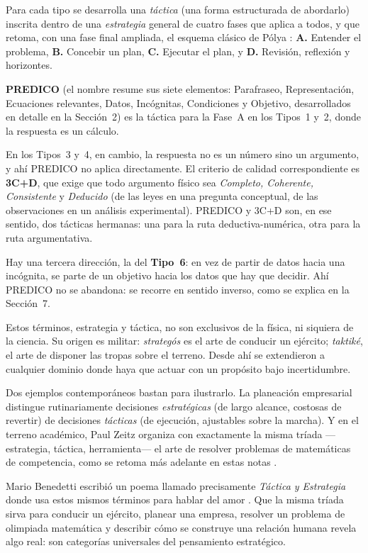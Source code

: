 \documentclass[11pt]{book}
\begin{document}
\medskip
Para cada tipo se desarrolla una {\it táctica} (una forma estructurada de abordarlo) inscrita dentro de una {\it estrategia} general de cuatro fases que aplica a todos, y que retoma, con una fase final ampliada, el esquema clásico de Pólya \cite{Polya1945}: {\bf A.} Entender el problema, {\bf B.} Concebir un plan, {\bf C.} Ejecutar el plan, y {\bf D.} Revisión, reflexión y horizontes.

\medskip
{\bf PREDICO} (el nombre resume sus siete elementos: Parafraseo, Representación, Ecuaciones relevantes, Datos, Incógnitas, Condiciones y Objetivo, desarrollados en detalle en la Sección~2) es la táctica para la Fase~A en los Tipos~1 y~2, donde la respuesta es un cálculo.

\medskip
En los Tipos~3 y~4, en cambio, la respuesta no es un número sino un argumento, y ahí PREDICO no aplica directamente. El criterio de calidad correspondiente es {\bf 3C+D}, que exige que todo argumento físico sea {\it Completo, Coherente, Consistente} y {\it Deducido} (de las leyes en una pregunta conceptual, de las observaciones en un análisis experimental). PREDICO y 3C+D son, en ese sentido, dos tácticas hermanas: una para la ruta deductiva-numérica, otra para la ruta argumentativa.

\medskip
Hay una tercera dirección, la del {\bf Tipo~6}: en vez de partir de datos hacia una incógnita, se parte de un objetivo hacia los datos que hay que decidir. Ahí PREDICO no se abandona: se recorre en sentido inverso, como se explica en la Sección~7.

\medskip
Estos términos, estrategia y táctica, no son exclusivos de la física, ni siquiera de la ciencia. Su origen es militar: {\it strategós} es el arte de conducir un ejército; {\it taktiké}, el arte de disponer las tropas sobre el terreno. Desde ahí se extendieron a cualquier dominio donde haya que actuar con un propósito bajo incertidumbre.

\medskip
Dos ejemplos contemporáneos bastan para ilustrarlo. La planeación empresarial distingue rutinariamente decisiones {\it estratégicas} (de largo alcance, costosas de revertir) de decisiones {\it tácticas} (de ejecución, ajustables sobre la marcha). Y en el terreno académico, Paul Zeitz organiza con exactamente la misma tríada --- estrategia, táctica, herramienta--- el arte de resolver problemas de matemáticas de competencia, como se retoma más adelante en estas notas \cite{Zeitz2006}.

\medskip
Mario Benedetti escribió un poema llamado precisamente \textit{Táctica y Estrategia} donde usa estos mismos términos para hablar del amor \cite{Benedetti1986}. Que la misma tríada sirva para conducir un ejército, planear una empresa, resolver un problema de olimpiada matemática y describir cómo se construye una relación humana revela algo real: son categorías universales del pensamiento estratégico.
\end{document}
